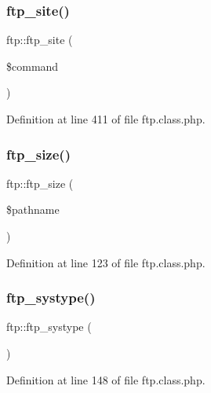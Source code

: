 \mbox{\label{classftp_ad8d0e176790559ee27d1008dede58b6a}} 
\subsubsection{\texorpdfstring{ftp\+\_\+site()}{ftp\_site()}}
{\footnotesize\ttfamily ftp\+::ftp\+\_\+site (\begin{DoxyParamCaption}\item[{}]{\$command }\end{DoxyParamCaption})}



Definition at line 411 of file ftp.\+class.\+php.

\mbox{\label{classftp_ac33a43d82a84e333224e5663eb298d82}} 
\subsubsection{\texorpdfstring{ftp\+\_\+size()}{ftp\_size()}}
{\footnotesize\ttfamily ftp\+::ftp\+\_\+size (\begin{DoxyParamCaption}\item[{}]{\$pathname }\end{DoxyParamCaption})}



Definition at line 123 of file ftp.\+class.\+php.

\mbox{\label{classftp_a4f41abd22a1239a475d49ec11a3618f4}} 
\subsubsection{\texorpdfstring{ftp\+\_\+systype()}{ftp\_systype()}}
{\footnotesize\ttfamily ftp\+::ftp\+\_\+systype (\begin{DoxyParamCaption}{ }\end{DoxyParamCaption})}



Definition at line 148 of file ftp.\+class.\+php.

\mbox{\label{classftp_ab8a20478b19800963c3a92762e78faa8}} 
